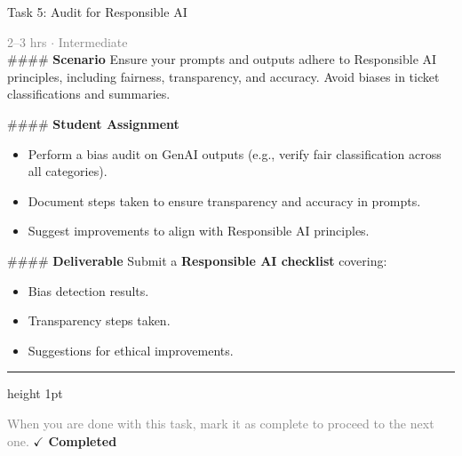 \documentclass[10pt,a4paper]{article}
\begin{document}
\begin{taskbox}{Task 5: Audit for Responsible AI}

    {\small \textcolor{gray}{2--3 hrs $\cdot$ Intermediate}}\\[12pt]

    \#\#\#\# \textbf{Scenario}
Ensure your prompts and outputs adhere to Responsible AI principles, including fairness, transparency, and accuracy. Avoid biases in ticket classifications and summaries.

\#\#\#\# \textbf{Student Assignment}
\begin{itemize}
    \item Perform a bias audit on GenAI outputs (e.g., verify fair classification across all categories).
    \item Document steps taken to ensure transparency and accuracy in prompts.
    \item Suggest improvements to align with Responsible AI principles.
\end{itemize}

\#\#\#\# \textbf{Deliverable}
Submit a \textbf{Responsible AI checklist} covering:
\begin{itemize}
    \item Bias detection results.
    \item Transparency steps taken.
    \item Suggestions for ethical improvements.\par
\end{itemize}

    \vspace{16pt}

    \textcolor{cardBorder}{\hrule height 1pt}\vspace{8pt}

    \small \textcolor{gray}{When you are done with this task, mark it as complete to proceed to the next one.} \hfill \textbf{\textcolor{brandDark}{$\checkmark$ Completed}}

\end{taskbox}
\end{document}
